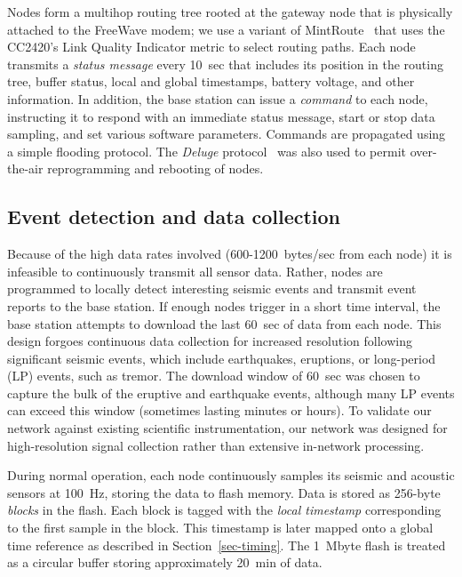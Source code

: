 Nodes form a multihop routing tree rooted at the gateway node that is
physically attached to the FreeWave modem; we use a variant of
MintRoute~\cite{awoo-multihop} that uses the CC2420's Link
Quality Indicator metric to select routing paths. Each node transmits a
{\em status message} every 10~sec that includes its position in 
the routing tree, buffer status, local and global timestamps, 
battery voltage, and other information. 
In addition, the base station can issue a {\em command} to each node,
instructing it to respond with an immediate status message, start or
stop data sampling, and set various software parameters.
Commands are propagated using a simple flooding protocol. 
The {\em Deluge} protocol~\cite{deluge} was also used to permit over-the-air
reprogramming and rebooting of nodes.

\subsection{Event detection and data collection}

Because of the high data rates involved (600-1200~bytes/sec 
from each node) it is infeasible to continuously transmit 
all sensor data. Rather,
nodes are programmed to locally detect interesting seismic events
and transmit event reports to the base station. If enough nodes
trigger in a short time interval, the base station attempts to
download the last 60~sec of data from each node. 
This design forgoes continuous
data collection for increased resolution following significant seismic
events, which include earthquakes, eruptions, or long-period (LP)
events, such as tremor.
The download window of 60~sec was chosen to capture the bulk
of the eruptive and earthquake events, although many LP events
can exceed this window (sometimes lasting minutes or hours).
To validate our network against existing scientific instrumentation,
our network was designed for high-resolution signal collection
rather than extensive in-network processing.

During normal operation, each node continuously samples its seismic 
and acoustic sensors at 100~Hz, storing the data to flash
memory. Data is stored as 256-byte {\em blocks} in the flash.
Each block 
is tagged with the {\em local timestamp} corresponding 
to the first sample in the block. 
This timestamp is later mapped onto a global time reference
as described in Section~\ref{sec-timing}. The 1~Mbyte flash is treated 
as a circular buffer storing approximately 20~min of data. 

